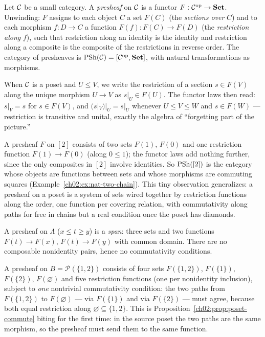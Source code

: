 \begin{definition}[Presheaf]\label{ch02:def:presheaf}
Let $\mathcal{C}$ be a small category. A \emph{presheaf} on $\mathcal{C}$ is a functor
$F : \mathcal{C}^{\mathrm{op}} \to \mathbf{Set}$. Unwinding: $F$ assigns to each object
$C$ a set $F(C)$ (the \emph{sections over} $C$) and to each morphism
$f : D \to C$ a function $F(f) : F(C) \to F(D)$ (the \emph{restriction
along} $f$), such that restriction along an identity is the identity and
restriction along a composite is the composite of the restrictions in
reverse order. The category of presheaves is
$\mathrm{PSh}(\mathcal{C}) = [\mathcal{C}^{\mathrm{op}}, \mathbf{Set}]$, with natural transformations as
morphisms.
\end{definition}

When $\mathcal{C}$ is a poset and $U \le V$, we write the restriction of a
section $s \in F(V)$ along the unique morphism $U \to V$ as
$s|_U \in F(U)$. The functor laws then read: $s|_V = s$ for
$s \in F(V)$, and $(s|_V)|_U = s|_U$ whenever $U \le V \le W$ and
$s \in F(W)$ --- restriction is transitive and unital, exactly the
algebra of ``forgetting part of the picture.''

\begin{example}\label{ch02:ex:psh-two-chain}
A presheaf $F$ on $[2]$ consists of two sets $F(1)$, $F(0)$ and one
restriction function $F(1) \to F(0)$ (along $0 \le 1$); the functor laws
add nothing further, since the only composites in $[2]$ involve
identities. So $\mathrm{PSh}([2])$ is the category whose objects are functions
between sets and whose morphisms are commuting squares
(Example~\ref{ch02:ex:nat-two-chain}). This tiny observation generalizes: a
presheaf on a poset is a system of sets wired together
by restriction functions along the order, one function per covering
relation, with commutativity along paths for free in chains but a real
condition once the poset has diamonds.
\end{example}

\begin{example}\label{ch02:ex:psh-vee}
A presheaf on $\Lambda$ ($x \le t \ge y$) is a \emph{span}: three sets
and two functions $F(t) \to F(x)$, $F(t) \to F(y)$ with common domain.
There are no composable nonidentity pairs, hence no commutativity
conditions.
\end{example}

\begin{example}\label{ch02:ex:psh-square}
A presheaf on $B = \mathcal{P}(\{1,2\})$ consists of four sets
$F(\{1,2\})$, $F(\{1\})$, $F(\{2\})$, $F(\varnothing)$ and five
restriction functions (one per nonidentity inclusion), subject to
\emph{one} nontrivial commutativity condition: the two paths from
$F(\{1,2\})$ to $F(\varnothing)$ --- via $F(\{1\})$ and via $F(\{2\})$
--- must agree, because both equal restriction along
$\varnothing \subseteq \{1,2\}$. This is
Proposition~\ref{ch02:prop:poset-commute} biting for the first time: in
the source poset the two paths are the same morphism, so the presheaf
must send them to the same function.
\end{example}

